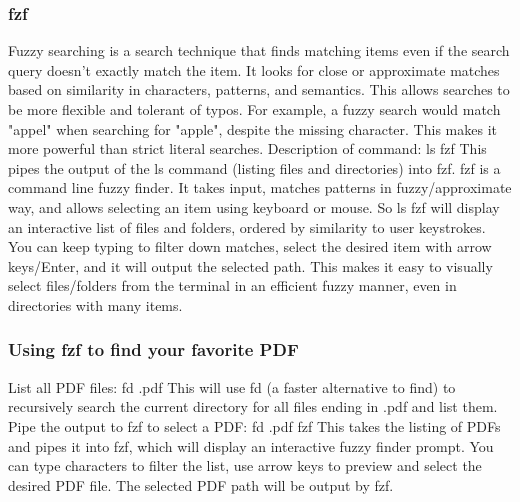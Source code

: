 \documentclass [ titlepage ]{article}
\begin{document}
\subsubsection{ fzf}
Fuzzy searching is a search technique that finds matching items even if the search query doesn't exactly match the item. It looks for close or
 approximate matches based on similarity in characters, patterns, and semantics. This allows searches to be more flexible and tolerant of
 typos.\newline
For example, a fuzzy search would match "appel" when searching for "apple", despite the missing character. This makes it more powerful than
 strict literal searches. \newline
Description of command: ls \textbar \space fzf \newline
This pipes the output of the ls command (listing files and directories) into fzf. \newline
fzf is a command line fuzzy finder. It takes input, matches patterns in fuzzy/approximate way, and allows selecting an item using keyboard or
 mouse. \newline
So ls \textbar \space fzf will display an interactive list of files and folders, ordered by similarity to user keystrokes. You can keep typing to filter down
 matches, select the desired item with arrow keys/Enter, and it will output the selected path. \newline
This makes it easy to visually select files/folders from the terminal in an efficient fuzzy manner, even in directories with many items. \newline

\subsubsection{Using fzf to find your favorite PDF}
List all PDF files: \newline
\textdollar fd .pdf \newline
This will use fd (a faster alternative to find) to recursively search the current directory for all files ending in .pdf and list them. \newline
Pipe the output to fzf to select a PDF: \newline
\textdollar fd .pdf \textbar \space fzf \newline
This takes the listing of PDFs and pipes it into fzf, which will display an interactive fuzzy finder prompt. You can type characters to filter the list,
 use arrow keys to preview and select the desired PDF file.
The selected PDF path will be output by fzf.
\end{document}

